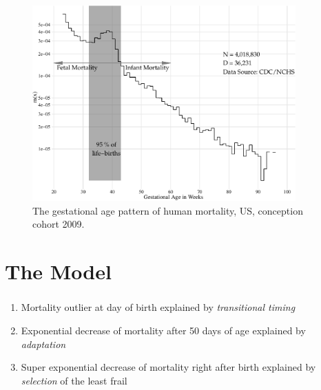 \documentclass{beamer}
\begin{document}
\begin{frame}
\frametitle{\insertsection}

\begin{figure}[htb!]
\includegraphics[width = 0.9\textwidth]{./fig/fimort_log_mx.pdf} \\
The gestational age pattern of human mortality, US, conception cohort 2009.
\end{figure}

\end{frame}

\section{The Model} %

\begin{frame}
\frametitle{\insertsection}

\begin{enumerate}
\item Mortality outlier at day of birth explained by \emph{transitional timing}
\item Exponential decrease of mortality after 50 days of age explained by \emph{adaptation}
\item Super exponential decrease of mortality right after birth explained by \emph{selection} of the least frail
\end{enumerate}

\end{frame}
\end{document}
